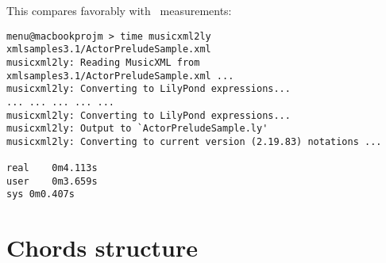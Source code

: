 This compares favorably with \mxmlToLy\ measurements:
\begin{lstlisting}[language=MusicXML]
menu@macbookprojm > time musicxml2ly xmlsamples3.1/ActorPreludeSample.xml
musicxml2ly: Reading MusicXML from xmlsamples3.1/ActorPreludeSample.xml ...
musicxml2ly: Converting to LilyPond expressions...
... ... ... ... ...
musicxml2ly: Converting to LilyPond expressions...
musicxml2ly: Output to `ActorPreludeSample.ly'
musicxml2ly: Converting to current version (2.19.83) notations ...

real	0m4.113s
user	0m3.659s
sys	0m0.407s
\end{lstlisting}


\section{Chords structure}


